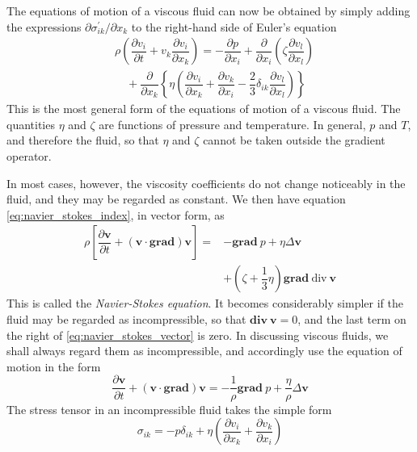 \documentclass[conference]{IEEEtran}
\theoremstyle{definition}
\theoremstyle{remark}
\begin{document}
    The equations of motion of a viscous fluid can now be obtained by simply adding the expressions $\partial \sigma^\prime_{ik} / \partial x_k$ to the right-hand side of Euler's equation
    \begin{align}
        & \rho \left( \dfrac{\partial v_i}{\partial t} + v_k \dfrac{\partial v_i}{\partial x_k} \right) = -\dfrac{\partial p}{\partial x_i} + \dfrac{\partial}{\partial x_i} \left( \zeta \dfrac{\partial v_l}{\partial x_l} \right) \nonumber \\ 
        & \quad + \dfrac{\partial}{\partial x_k} \left\{ \eta \left( \dfrac{\partial v_i}{\partial x_k} + \dfrac{\partial v_k}{\partial x_i} -\dfrac23 \delta_{ik} \dfrac{\partial v_l}{\partial x_l} \right) \right\}
        \label{eq:navier_stokes_index}
    \end{align}
    This is the most general form of the equations of motion of a viscous fluid. The quantities $\eta$ and $\zeta$ are functions of pressure and temperature. In general, $p$ and $T$, and therefore the fluid, so that $\eta$ and $\zeta$ cannot be taken outside the gradient operator.

    In most cases, however, the viscosity coefficients do not change noticeably in the fluid, and they may be regarded as constant. We then have equation \ref{eq:navier_stokes_index}, in vector form, as
    \begin{align}
        \rho \left[ \dfrac{\partial \mathbf{v}}{\partial t} + (\mathbf{v} \cdot \textbf{grad}) \mathbf{v} \right] =& -\textbf{grad} \ p + \eta \Delta \mathbf{v} \nonumber \\
        & + (\zeta + \dfrac13 \eta) \textbf{grad} \ \text{div} \ \mathbf{v}
        \label{eq:navier_stokes_vector}
    \end{align}
    This is called the \emph{Navier-Stokes equation}. It becomes considerably simpler if the fluid may be regarded as incompressible, so that $\textbf{div} \ \mathbf{v} = 0$, and the last term on the right of \ref{eq:navier_stokes_vector} is zero. In discussing viscous fluids, we shall always regard them as incompressible, and accordingly use the equation of motion in the form
    \begin{equation}
        \dfrac{\partial \mathbf{v}}{\partial t} + (\mathbf{v} \cdot \textbf{grad}) \mathbf{v} = -\dfrac1\rho \textbf{grad} \ p + \dfrac{\eta}{\rho} \Delta \mathbf{v}
        \label{eq:ns_impressible}
    \end{equation}
    The stress tensor in an incompressible fluid takes the simple form
    \begin{equation}
        \sigma_{ik} = - p \delta_{ik} + \eta \left( \dfrac{\partial v_i}{\partial x_k} + \dfrac{\partial v_k}{\partial x_i} \right)
    \end{equation}
\end{document}
